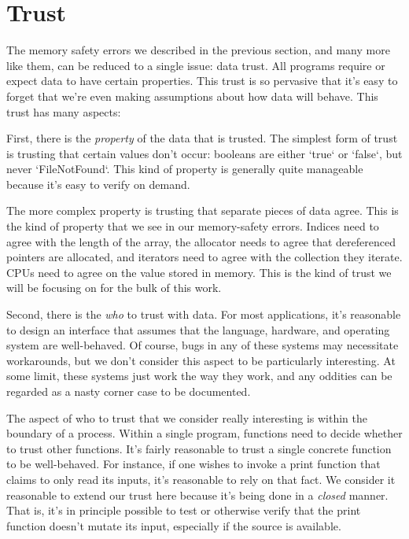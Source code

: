 \chapter{Trust}
\label{ch:trust}

The memory safety errors we described in the previous
section, and many more like them, can be reduced to a single issue: data trust.
All programs require or expect data to have certain properties. This trust
is so pervasive that it's easy to forget that we're even making assumptions about
how data will behave. This trust has many aspects:




First, there is the \emph{property} of the data that is trusted. The simplest form of
trust is trusting that certain values don't occur: booleans are either `true`
or `false`, but never `FileNotFound`. This kind of property is generally quite
manageable because it's easy to verify on demand.

The more complex property is trusting that separate pieces of data agree.
This is the kind of property that we see in our memory-safety errors. Indices need
to agree with the length of the array, the allocator needs to agree that
dereferenced pointers are allocated, and iterators need to agree with the collection
they iterate. CPUs need to agree on the value stored in memory. This is the kind of
trust we will be focusing on for the bulk of this work.




Second, there is the \emph{who} to trust with data. For most applications, it's
reasonable to design an interface that assumes that the language, hardware, and
operating system are well-behaved. Of course, bugs in any of these systems
may necessitate workarounds, but we don't consider this aspect to be particularly
interesting. At some limit, these systems just work the way they work, and any
oddities can be regarded as a nasty corner case to be documented.

The aspect of who to trust that we consider really interesting is within the
boundary of a process. Within a single program, functions need to decide whether
to trust other functions. It's fairly reasonable to trust a single concrete
function to be well-behaved. For instance, if one wishes to invoke a print
function that claims to only read its inputs, it's reasonable to rely on that
fact. We consider it reasonable to extend our trust here because it's being done
in a \emph{closed} manner. That is, it's in principle possible to test or otherwise
verify that the print function doesn't mutate its input, especially if the
source is available.

